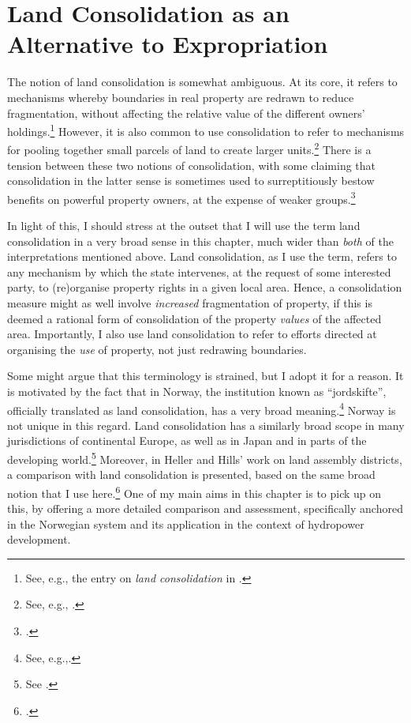 
\section{Land Consolidation as an Alternative to Expropriation}\label{sec:lce}

The notion of land consolidation is somewhat ambiguous. At its core, it refers to  mechanisms whereby boundaries in real property are redrawn to reduce fragmentation, without affecting the relative value of the different owners' holdings.\footnote{See, e.g., the entry on {\it land consolidation} in \cite{mayhew09}.} However, it is also common to use consolidation to refer to mechanisms for pooling together small parcels of land to create larger units.\footnote{See, e.g., \cite{lerman06}.} There is a tension between these two notions of consolidation, with some claiming that consolidation in the latter sense is sometimes used to surreptitiously bestow benefits on powerful property owners, at the expense of weaker groups.\footcite[237-239]{lipton09}

In light of this, I should stress at the outset that I will use the term land consolidation in a very broad sense in this chapter, much wider than {\it both} of the interpretations mentioned above. Land consolidation, as I use the term, refers to any mechanism by which the state intervenes, at the request of some interested party, to (re)organise property rights in a given local area. Hence, a consolidation measure might as well involve {\it increased} fragmentation of property, if this is deemed a rational form of consolidation of the property {\it values} of the affected area. Importantly, I also use land consolidation to refer to efforts directed at organising the {\it use} of property, not just redrawing boundaries.

Some might argue that this terminology is strained, but I adopt it for a reason. It is motivated by the fact that in Norway, the institution known as ``jordskifte'', officially translated as land consolidation, has a very broad meaning.\footnote{See, e.g.,\cite{reiten09,rognes03}.} Norway is not unique in this regard. Land consolidation has a similarly broad scope in many jurisdictions of continental Europe, as well as in Japan and in parts of the developing world.\footnote{See \cite{sky07,vitikainen04}.} Moreover, in Heller and Hills' work on land assembly districts, a comparison with land consolidation is presented, based on the same broad notion that I use here.\footcite{heller08} One of my main aims in this chapter is to pick up on this, by offering a more detailed comparison and assessment, specifically anchored in the Norwegian system and its application in the context of hydropower development.

